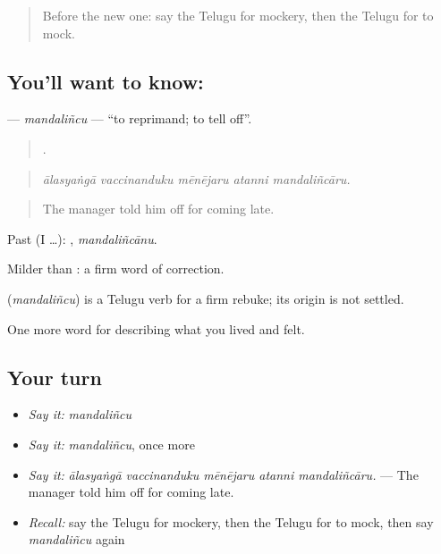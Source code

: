 \label{lesson:TE-C535-mandalincu}



\begin{quote}
Before the new one: say the Telugu for mockery, then the Telugu for to mock.
\end{quote}

\subsection*{You'll want to know: }
\textbf{} — \emph{mandaliñcu} — \textquotedblleft{}to reprimand; to tell off\textquotedblright{}.

\begin{quote}
    .
\end{quote}

\begin{quote}
\emph{ālasyaṅgā vaccinanduku mēnējaru atanni mandaliñcāru.}
\end{quote}

\begin{quote}
The manager told him off for coming late.
\end{quote}

Past (I …): , \emph{mandaliñcānu}.

Milder than : a firm word of correction.

\begin{cousinweb}
\textbf{} (\emph{mandaliñcu}) is a Telugu verb for a firm rebuke; its origin is not settled.
\end{cousinweb}

\begin{grammarlens}[title={What you've built}]
One more word for describing what you lived and felt.
\end{grammarlens}

\subsection*{Your turn}
\begin{itemize}
\raggedright
  \item \emph{Say it:} \emph{mandaliñcu}
  \item \emph{Say it:} \emph{mandaliñcu}, once more
  \item \emph{Say it:} \emph{ālasyaṅgā vaccinanduku mēnējaru atanni mandaliñcāru.} — The manager told him off for coming late.
  \item \emph{Recall:} say the Telugu for mockery, then the Telugu for to mock, then say \emph{mandaliñcu} again
\end{itemize}

